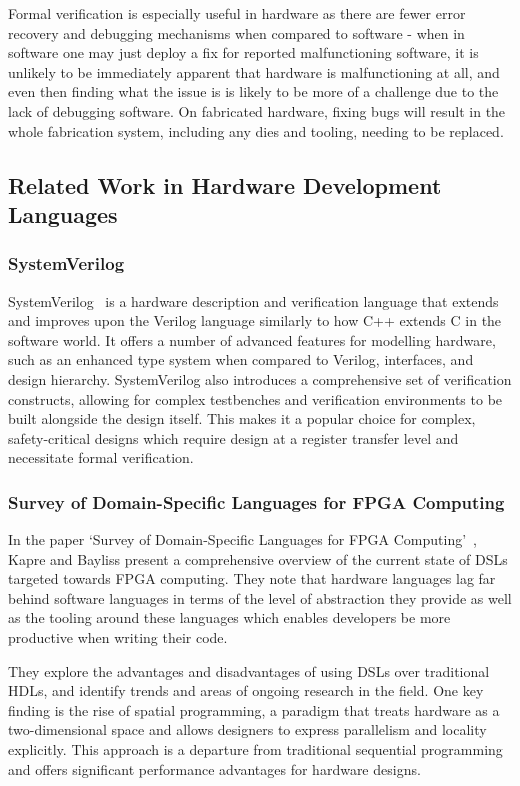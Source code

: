 Formal verification is especially useful in hardware as there are fewer error recovery and debugging mechanisms when compared to software \hyphen{} when in software one may just deploy a fix for reported malfunctioning software, it is unlikely to be immediately apparent that hardware is malfunctioning at all, and even then finding what the issue is is likely to be more of a challenge due to the lack of debugging software. On fabricated hardware, fixing bugs will result in the whole fabrication system, including any dies and tooling, needing to be replaced.

\subsection{Related Work in Hardware Development Languages}
\subsubsection{SystemVerilog}
SystemVerilog \cite{8299595} is a hardware description and verification language that extends and improves upon the Verilog language similarly to how C++ extends C in the software world. It offers a number of advanced features for modelling hardware, such as an enhanced type system when compared to Verilog, interfaces, and design hierarchy. SystemVerilog also introduces a comprehensive set of verification constructs, allowing for complex testbenches and verification environments to be built alongside the design itself. This makes it a popular choice for complex, safety-critical designs which require design at a register transfer level and necessitate formal verification.

\subsubsection{Survey of Domain-Specific Languages for FPGA Computing}
In the paper `Survey of Domain-Specific Languages for FPGA Computing' \cite{7577380}, Kapre and Bayliss present a comprehensive overview of the current state of DSLs targeted towards FPGA computing. They note that hardware languages lag far behind software languages in terms of the level of abstraction they provide as well as the tooling around these languages which enables developers be more productive when writing their code.

They explore the advantages and disadvantages of using DSLs over traditional HDLs, and identify trends and areas of ongoing research in the field. One key finding is the rise of spatial programming, a paradigm that treats hardware as a two-dimensional space and allows designers to express parallelism and locality explicitly. This approach is a departure from traditional sequential programming and offers significant performance advantages for hardware designs.

